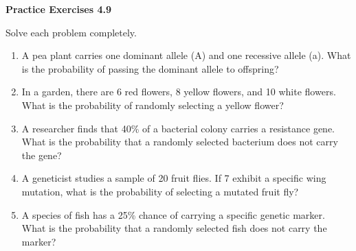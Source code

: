 \vspace{0.3ex}
\noindent\textbf{Practice Exercises 4.9}

\vspace{0.2ex}

Solve each problem completely.
\begin{enumerate}[noitemsep, label = \color{blue}\arabic*. ]
    \item A pea plant carries one dominant allele (A) and one recessive allele (a). What is the probability of passing the dominant allele to offspring?
    \item In a garden, there are 6 red flowers, 8 yellow flowers, and 10 white flowers. What is the probability of randomly selecting a yellow flower?
    \item A researcher finds that 40\% of a bacterial colony carries a resistance gene. What is the probability that a randomly selected bacterium does not carry the gene?
    \item A geneticist studies a sample of 20 fruit flies. If 7 exhibit a specific wing mutation, what is the probability of selecting a mutated fruit fly?
    \item A species of fish has a 25\% chance of carrying a specific genetic marker. What is the probability that a randomly selected fish does not carry the marker?
\end{enumerate}

